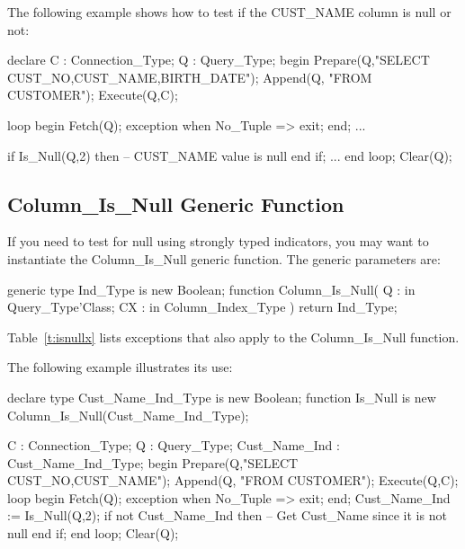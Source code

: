 \documentclass[english,letterpaper]{book}
\begin{document}
The following example shows how to test if the CUST\_NAME column is
null or not:

\begin{Example}
declare
   C : Connection_Type;
   Q : Query_Type;
begin
   Prepare(Q,"SELECT CUST_NO,CUST_NAME,BIRTH_DATE");
   Append(Q, "FROM CUSTOMER");
   Execute(Q,C);

   loop
      begin
         Fetch(Q);
      exception
         when No_Tuple =>
            exit;
      end;
      ...

      if Is_Null(Q,2) then
         -- CUST_NAME value is null
      end if;
      ...
   end loop;
   Clear(Q);
\end{Example}

\subsection{Column\_Is\_Null Generic Function}

If you need to test for null using strongly typed
indicators, you may want to instantiate the
Column\_Is\_Null generic function. The generic parameters are:

\begin{Code}
generic
   type Ind_Type is new Boolean;
function Column_Is_Null(
   Q :  in Query_Type'Class;
   CX : in Column_Index_Type
) return Ind_Type;
\end{Code}

Table~\ref{t:isnullx} lists exceptions that also apply to the Column\_Is\_Null function.


The following example illustrates its use:

\begin{Example}
declare
   type Cust_Name_Ind_Type is new Boolean;
   function Is_Null
       is new Column_Is_Null(Cust_Name_Ind_Type);

   C :             Connection_Type;
   Q :             Query_Type;
   Cust_Name_Ind : Cust_Name_Ind_Type;
 begin
   Prepare(Q,"SELECT CUST_NO,CUST_NAME");
   Append(Q, "FROM CUSTOMER");
   Execute(Q,C);
   loop
      begin
         Fetch(Q);
      exception
         when No_Tuple =>
            exit;
      end;
      Cust_Name_Ind := Is_Null(Q,2);
      if not Cust_Name_Ind then
         -- Get Cust_Name since it is not null
      end if;
   end loop;
   Clear(Q);
\end{Example}
\end{document}
